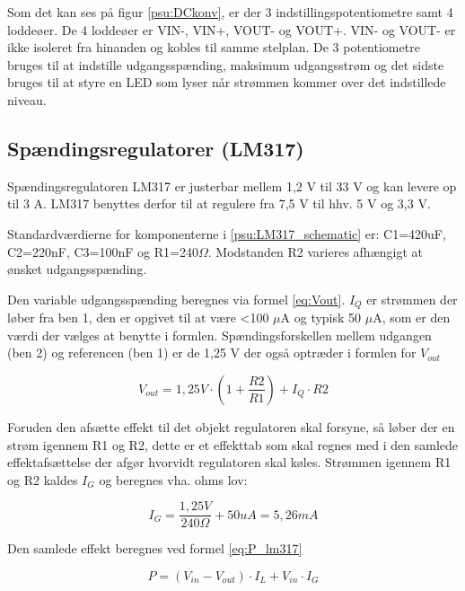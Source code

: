 Som det kan ses på figur \ref{psu:DCkonv}, er der 3 indstillingspotentiometre samt 4 loddeøer. De 4 loddeøer er VIN-, VIN+, VOUT- og VOUT+. VIN- og VOUT- er ikke isoleret fra hinanden og kobles til samme stelplan. De 3 potentiometre bruges til at indstille udgangsspænding, maksimum udgangsstrøm og det sidste bruges til at styre en LED som lyser når strømmen kommer over det indstillede niveau. 

\subsection{Spændingsregulatorer (LM317)}

Spændingsregulatoren LM317 er justerbar mellem 1,2 V til 33 V og kan levere op til 3 A. LM317 benyttes derfor til at regulere fra 7,5 V til hhv. 5 V og 3,3 V. 


Standardværdierne for komponenterne i \ref{psu:LM317_schematic} er: C1=420uF, C2=220nF, C3=100nF og R1=240$\Omega$. Modstanden R2 varieres afhængigt at ønsket udgangsspænding. 

Den variable udgangsspænding beregnes via formel \ref{eq:Vout}. $I_{Q}$ er strømmen der løber fra ben 1, den er opgivet til at være <100 $\mu$A og typisk 50 $\mu$A, som er den værdi der vælges at benytte i formlen. Spændingsforskellen mellem udgangen (ben 2) og referencen (ben 1) er de 1,25 V der også optræder i formlen for $V_{out}$   

\begin{equation} 
{ V }_{ out }=1,25V\cdot \left( 1+\frac { R2 }{ R1 }  \right) +{ I }_{ Q }\cdot R2
\label{eq:Vout}
\end{equation}

Foruden den afsætte effekt til det objekt regulatoren skal forsyne, så løber der en strøm igennem R1 og R2, dette er et effekttab som skal regnes med i den samlede effektafsættelse der afgør hvorvidt regulatoren skal køles. Strømmen igennem R1 og R2 kaldes $I_{G}$ og beregnes vha. ohms lov:

\begin{equation} 
{ I }_{ G }=\frac { 1,25V }{ 240\Omega  } +50uA=5,26mA
\label{eq:IG}
\end{equation}

Den samlede effekt beregnes ved formel \ref{eq:P_lm317} 

\begin{equation} 
{ P }=({ V }_{ in }-{ V }_{ out })\cdot { I }_{ L }+{ V }_{ in }\cdot { I }_{ G }
\label{eq:P_lm317}
\end{equation}



